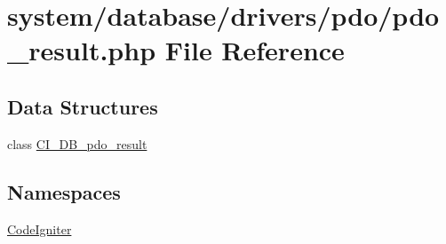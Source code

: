 \hypertarget{pdo__result_8php}{\section{system/database/drivers/pdo/pdo\-\_\-result.php File Reference}
\label{pdo__result_8php}
}
\subsection*{Data Structures}
\begin{DoxyCompactItemize}
\item 
class \hyperlink{class_c_i___d_b__pdo__result}{C\-I\-\_\-\-D\-B\-\_\-pdo\-\_\-result}
\end{DoxyCompactItemize}
\subsection*{Namespaces}
\begin{DoxyCompactItemize}
\item 
\hyperlink{namespace_code_igniter}{Code\-Igniter}
\end{DoxyCompactItemize}
